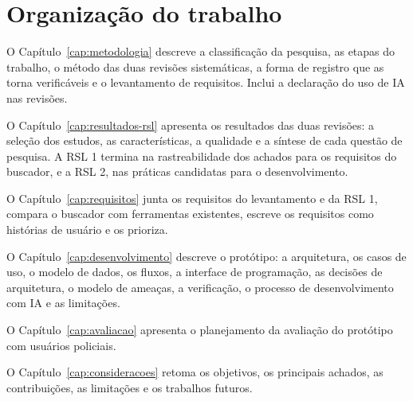 \section{Organização do trabalho}
\label{sec:intro-organizacao}

O Capítulo~\ref{cap:metodologia} descreve a classificação da pesquisa, as
etapas do trabalho, o método das duas revisões sistemáticas, a forma de
registro que as torna verificáveis e o levantamento de requisitos. Inclui a
declaração do uso de IA nas revisões.

O Capítulo~\ref{cap:resultados-rsl} apresenta os resultados das duas
revisões: a seleção dos estudos, as características, a qualidade e a síntese
de cada questão de pesquisa. A RSL 1 termina na rastreabilidade dos achados
para os requisitos do buscador, e a RSL 2, nas práticas candidatas para o
desenvolvimento.

O Capítulo~\ref{cap:requisitos} junta os requisitos do levantamento e da RSL
1, compara o buscador com ferramentas existentes, escreve os requisitos como
histórias de usuário e os prioriza.

O Capítulo~\ref{cap:desenvolvimento} descreve o protótipo: a arquitetura, os
casos de uso, o modelo de dados, os fluxos, a interface de programação, as
decisões de arquitetura, o modelo de ameaças, a verificação, o processo de
desenvolvimento com IA e as limitações.

O Capítulo~\ref{cap:avaliacao} apresenta o planejamento da avaliação do protótipo
com usuários policiais.

O Capítulo~\ref{cap:consideracoes} retoma os objetivos, os principais
achados, as contribuições, as limitações e os trabalhos futuros.

\endgroup
